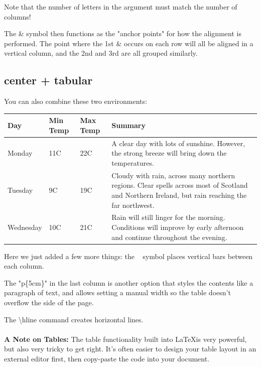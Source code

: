\documentclass{article}
\begin{document}
        Note that the number of letters in the argument must match the number of columns!
        
        The \& symbol then functions as the "anchor points" for how the alignment is performed. The point where the 1st \& occurs on each row will all be aligned in a vertical column, and the 2nd and 3rd are all grouped similarly.

    \subsection{center + tabular}
        You can also combine these two environments:
        
        \begin{center}
            \begin{tabular}{| l | l | l | p{5cm} |}
            \hline
            Day & Min Temp & Max Temp & Summary \\ \hline
            Monday & 11C & 22C & A clear day with lots of sunshine.
            However, the strong breeze will bring down the temperatures. \\ \hline
            Tuesday & 9C & 19C & Cloudy with rain, across many northern regions. Clear spells 
            across most of Scotland and Northern Ireland, 
            but rain reaching the far northwest. \\ \hline
            Wednesday & 10C & 21C & Rain will still linger for the morning. 
            Conditions will improve by early afternoon and continue 
            throughout the evening. \\
            \hline
            \end{tabular}
        \end{center}
        
        Here we just added a few more things: the \textbar~ symbol places vertical bars between each column.
        
        The "p\{5cm\}" in the last column is another option that styles the contents like a paragraph of text, and allows setting a manual width so the table doesn't overflow the side of the page.
        
        The \textbackslash hline command creates horizontal lines. \\\\
        
        \textbf{A Note on Tables:} The table functionality built into \LaTeX is very powerful, but also very tricky to get right. It's often easier to design your table layout in an external editor first, then copy-paste the code into your document.
        
\end{document}
